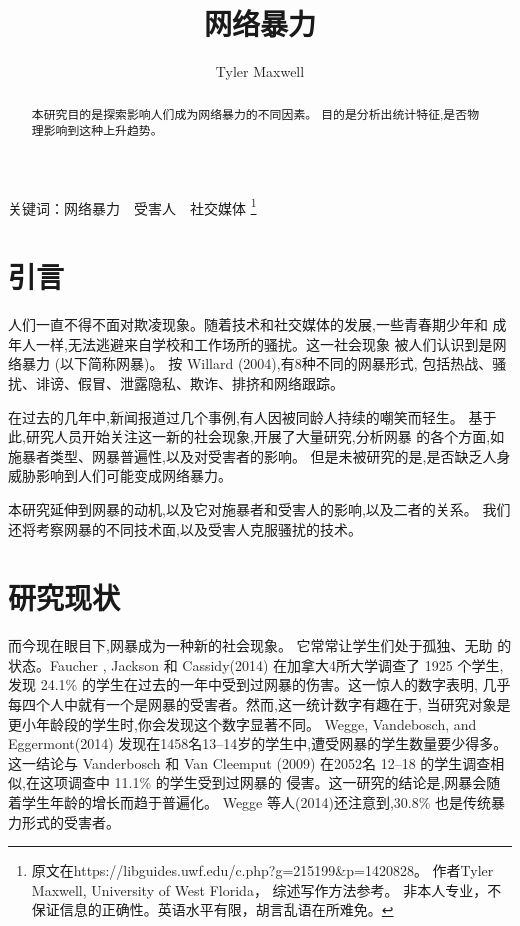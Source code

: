 \documentclass[a4paper]{article}
\title{网络暴力}
\author{Tyler Maxwell}
\begin{document}
\maketitle

\begin{abstract}
本研究目的是探索影响人们成为网络暴力的不同因素。
目的是分析出统计特征,是否物理影响到这种上升趋势。
\end{abstract}

关键词：网络暴力~~受害人~~社交媒体
\footnote{原文在https://libguides.uwf.edu/c.php?g=215199\&p=1420828。
作者Tyler Maxwell, University of West Florida，
综述写作方法参考\cite{rand2009}。
非本人专业，不保证信息的正确性。英语水平有限，胡言乱语在所难免。
}


\section{引言}
人们一直不得不面对欺凌现象。随着技术和社交媒体的发展,一些青春期少年和
成年人一样,无法逃避来自学校和工作场所的骚扰。这一社会现象
被人们认识到是网络暴力 (以下简称网暴)。
按 Willard (2004)\cite{Willard2004},有8种不同的网暴形式,
包括热战、骚扰、诽谤、假冒、泄露隐私、欺诈、排挤和网络跟踪。

在过去的几年中,新闻报道过几个事例,有人因被同龄人持续的嘲笑而轻生。
基于此,研究人员开始关注这一新的社会现象,开展了大量研究,分析网暴
的各个方面,如施暴者类型、网暴普遍性,以及对受害者的影响。
但是未被研究的是,是否缺乏人身威胁影响到人们可能变成网络暴力。

本研究延伸到网暴的动机,以及它对施暴者和受害人的影响,以及二者的关系。
我们还将考察网暴的不同技术面,以及受害人克服骚扰的技术。

\section{研究现状}
而今现在眼目下,网暴成为一种新的社会现象。
它常常让学生们处于孤独、无助
的状态。Faucher , Jackson 和 Cassidy(2014)\cite{faucher2014}
在加拿大4所大学调查了 1925 个学生,
发现 24.1\% 的学生在过去的一年中受到过网暴的伤害。这一惊人的数字表明,
几乎每四个人中就有一个是网暴的受害者。然而,这一统计数字有趣在于,
当研究对象是更小年龄段的学生时,你会发现这个数字显著不同。
Wegge, Vandebosch, and Eggermont(2014)\cite{wegge2014}
发现在1458名13--14岁的学生中,遭受网暴的学生数量要少得多。
这一结论与 Vanderbosch 和 Van Cleemput (2009)\cite{vander2009}
在2052名 12--18 的学生调查相似,在这项调查中 11.1\% 的学生受到过网暴的
侵害。这一研究的结论是,网暴会随着学生年龄的增长而趋于普遍化。
Wegge 等人(2014)\cite{wegge2014}还注意到,30.8\% 也是传统暴力形式的受害者。
\end{document}

